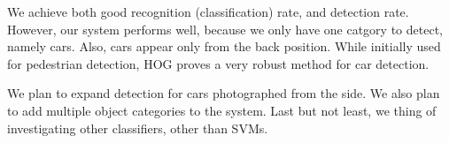 
We achieve both good recognition (classification) rate, and detection rate. However, our system performs well, because we only have one catgory to detect, namely cars. Also, cars appear only from the back position. While initially used for pedestrian detection, HOG proves a very robust method for car detection.

We plan to expand detection for cars photographed from the side.
We also plan to add multiple object categories to the system.
Last but not least, we thing of investigating other classifiers, other than SVMs.
